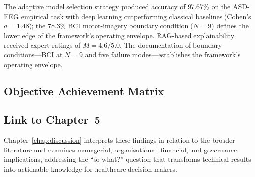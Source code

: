 The adaptive model selection strategy produced accuracy of 97.67\% on the ASD-EEG empirical task with deep learning outperforming classical baselines (Cohen's $d=1.48$); the 78.3\% BCI motor-imagery boundary condition ($N=9$) defines the lower edge of the framework's operating envelope. RAG-based explainability received expert ratings of $M = 4.6/5.0$. The documentation of boundary conditions---BCI at $N = 9$ and five failure modes---establishes the framework's operating envelope.

\subsection{Objective Achievement Matrix}

\subsection{Link to Chapter~5}

Chapter~\ref{chap:discussion} interprets these findings in relation to the broader literature and examines managerial, organisational, financial, and governance implications, addressing the ``so what?'' question that transforms technical results into actionable knowledge for healthcare decision-makers.
\fi

